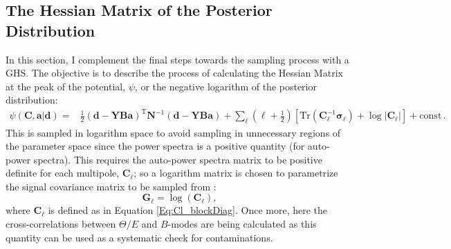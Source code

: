 \subsection{The Hessian Matrix of the Posterior Distribution}\label{Sec:BPL:Hessian}
In this section, I complement the final steps towards the sampling process with a GHS. The objective is to describe the process of calculating the Hessian Matrix at the peak of the potential, $\psi$, or the negative logarithm of the posterior distribution: 
\begin{align}
\psi(\mathbf{C},\mathbf{a}|\mathbf{d}) = & \frac{1}{2}(\mathbf{d}-\mathbf{YBa})^{\mathrm{T}}\mathbf{N}^{-1}(\mathbf{d}-\mathbf{YBa})+\sum_{\ell}\left( {\ell}+\frac{1}{2}\right)\left[ \mathrm{Tr}(\mathbf{C}_{\ell}^{-1}\boldsymbol{\sigma}_{\ell}) + \log\left|\mathbf{C}_{\ell} \right|\right] + \mathrm{const}\, .
\end{align}
This is sampled in logarithm space to avoid sampling in unnecessary regions of the parameter space since the power spectra is a positive quantity (for auto-power spectra). This requires the auto-power spectra matrix to be positive definite for each multipole, $\mathbf{C}_{\ell}$; so a logarithm matrix is chosen to parametrize the signal covariance matrix to be sampled from \citep{Taylor2008}:
\begin{equation}
\mathbf{G}_{\ell}=\log(\mathbf{C}_{\ell}),
\end{equation}
where $\mathbf{C}_{\ell}$ is defined as in Equation \eqref{Eq:Cl_blockDiag}. Once more, here the cross-correlations between $\Theta/E$ and $B$-modes are being calculated as this quantity can be used as a systematic check for contaminations.
